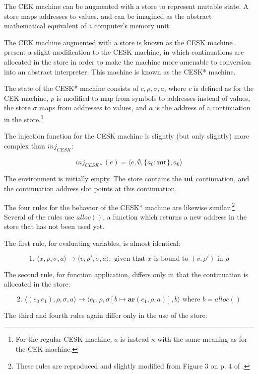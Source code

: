 \documentclass{article}
\begin{document}
The CEK machine can be augmented with a store to represent mutable state. A store maps addresses to values, and can be imagined as the abstract mathematical equivalent of a computer's memory unit.

The CEK machine augmented with a store is known as the CESK machine \cite{cesk}. \cite{aam} present a slight modification to the CESK machine, in which continuations are allocated in the store in order to make the machine more amenable to conversion into an abstract interpreter. This machine is known as the CESK* machine.

The state of the CESK* machine consists of $c, \rho, \sigma, a$, where $c$ is defined as for the CEK machine, $\rho$ is modified to map from symbols to addresses instead of values, the store $\sigma$ maps from addresses to values, and $a$ is the address of a continuation in the store.\footnote{For the regular CESK machine, $a$ is instead $\kappa$ with the same meaning as for the CEK machine.}

The injection function for the CESK machine is slightly (but only slightly) more complex than $inj_{CESK}$:

$$ inj_{CESK*}(e) = \langle e, \emptyset, \{ a_0: \textbf{mt} \}, a_0 \rangle $$

The environment is initially empty. The store contains the \textbf{mt} continuation, and the continuation address slot points at this continuation.

The four rules for the behavior of the CESK* machine are likewise similar.\footnote{These rules are reproduced and slightly modified from Figure 3 on p. 4 of \cite{aam}.} Several of the rules use $alloc()$, a function which returns a new address in the store that has not been used yet.

The first rule, for evaluating variables, is almost identical:

$$
\text{1. }
\langle x, \rho, \sigma, a \rangle
\to
\langle v, \rho', \sigma, a \rangle,
\text{ given that $x$ is bound to $(v, \rho')$ in $\rho$}
$$

The second rule, for function application, differs only in that the continuation is allocated in the store:

$$
\text{2. }
\langle (e_0\ e_1), \rho, \sigma, a \rangle
\to
\langle e_0, \rho, \sigma[b \mapsto \textbf{ar}(e_1, \rho, a)], b \rangle
\text{ where $b = alloc()$}
$$

The third and fourth rules again differ only in the use of the store:
\end{document}
